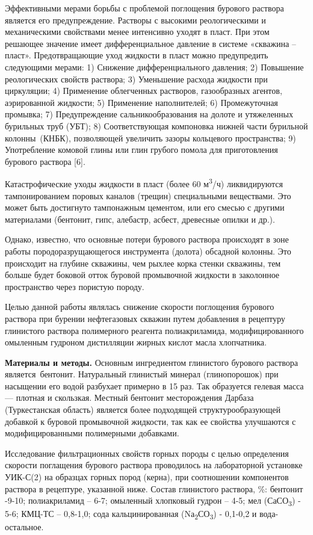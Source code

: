 \begin{multicols}{2}
Эффективными мерами борьбы с проблемой поглощения бурового раствора
является его предупреждение. Растворы с высокими реологическими и
механическими свойствами менее интенсивно ухо­дят в пласт. При этом
решающее значение имеет дифференциаль­ное давление в системе «скважина --
пласт». Предотвращаю­щие уход жидкости в пласт можно предупредить
следующими мерами: 1) Снижение дифференциального давления; 2) Повышение
реологических свойств раствора; 3) Уменьшение расхода жидкости при
циркуляции; 4) Применение облегченных растворов, газообразных агентов,
аэрированной жидкости; 5) Применение наполнителей; 6) Промежуточная
промывка; 7) Предупреждение сальникообразования на долоте и утяжеленных
бурильных труб (УБТ)\textsc{;} 8) Соответствующая компоновка нижней
части бурильной колонны~(КНБК), позволяющей увели­чить зазоры кольцевого
пространства; 9) Употребление комовой глины или глин грубого помола для
приготовления бурового раствора {[}6{]}.

Катастрофические уходы жидкости в пласт (более 60
м\textsuperscript{3}/ч) ликвидируются тампонированием поровых каналов
(трещин) специальными веще­ствами. Это может быть достигнуто тампонажным
цементом, или его смесью с другими материалами (бентонит, гипс,
алебастр, асбест, древес­ные опилки и др.).

Однако, известно, что основные потери бурового раствора происходят в
зоне работы породоразрущающегося инструмента (долота) обсадной колонны.
Это происходит на глубине скважины, чем рыхлее корка стенки скважины,
тем больше будет боковой отток буровой промывочной жидкости в заколонное
пространство через пористую породу.

Целью данной работы являлась снижение скорости поглощения бурового
раствора при бурении нефтегазовых скважин путем добавления в рецептуру
глинистого раствора полимерного реагента полиакриламида,
модифицированного омыленным гудроном дистилляции жирных кислот масла
хлопчатника.

{\bfseries Материалы и методы.} Основным ингредиентом глинистого бурового
раствора является~бентонит. Натуральный глинистый минерал (глинопорошок)
при насыщении его водой разбухает примерно в 15 раз. Так образуется
гелевая масса --- плотная и скользкая. Местный бентонит месторождения
Дарбаза (Туркестанская область) является более подходящей
структурообразующей добавкой к буровой промывочной жидкости, так как ее
свойства улучшаются с модифицированными полимерными добавками.

Исследование фильтрационных свойств горных породы с целью определения
скорости поглащения бурового раствора проводилось на лабораторной
установке УИК-С(2) на образцах горных пород (керна), при соотношении
компонентов раствора в рецептуре, указанной ниже. Состав глинистого
раствора, \%: бентонит -9-10; полиакриламид -- 6-7; омыленный хлопковый
гудрон -- 4-5; мел (СаСО\textsubscript{3}) - 5-6; КМЦ-ТС -- 0,8-1,0;
сода кальцинированная (Nа\textsubscript{2}СО\textsubscript{3}) - 0,1-0,2
и вода-остальное.


\end{multicols}
